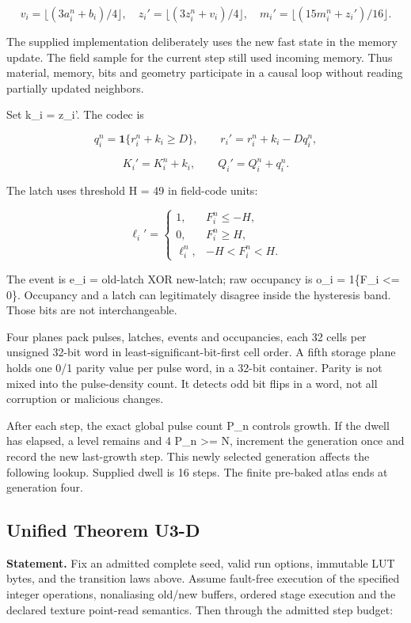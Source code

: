 \documentclass[11pt,a4paper]{article}
\begin{document}
\[v_i=\lfloor(3a_i^n+b_i)/4\rfloor,\quad
z_i'=\lfloor(3z_i^n+v_i)/4\rfloor,\quad
m_i'=\lfloor(15m_i^n+z_i')/16\rfloor.\]

The supplied implementation deliberately uses the new fast state in the memory update. The field sample for the current step still used incoming memory. Thus material, memory, bits and geometry participate in a causal loop without reading partially updated neighbors.

Set k\_i = z\_i'. The codec is

\[q_i^n=\mathbf1\{r_i^n+k_i\ge D\},\qquad
r_i'=r_i^n+k_i-Dq_i^n,\]

\[K_i'=K_i^n+k_i,\qquad Q_i'=Q_i^n+q_i^n.\]

The latch uses threshold H = 49 in field-code units:

\[\ell_i'=\begin{cases}1,&F_i^n\le-H,\\0,&F_i^n\ge H,\\\ell_i^n,&-H<F_i^n<H.\end{cases}\]

The event is e\_i = old-latch XOR new-latch; raw occupancy is o\_i = 1\{F\_i \textless= 0\}. Occupancy and a latch can legitimately disagree inside the hysteresis band. Those bits are not interchangeable.

Four planes pack pulses, latches, events and occupancies, each 32 cells per unsigned 32-bit word in least-significant-bit-first cell order. A fifth storage plane holds one 0/1 parity value per pulse word, in a 32-bit container. Parity is not mixed into the pulse-density count. It detects odd bit flips in a word, not all corruption or malicious changes.

After each step, the exact global pulse count P\_n controls growth. If the dwell has elapsed, a level remains and 4 P\_n \textgreater= N, increment the generation once and record the new last-growth step. This newly selected generation affects the following lookup. Supplied dwell is 16 steps. The finite pre-baked atlas ends at generation four.

\subsection{Unified Theorem U3-D}\label{unified-theorem-u3-d}

\textbf{Statement.} Fix an admitted complete seed, valid run options, immutable LUT bytes, and the transition laws above. Assume fault-free execution of the specified integer operations, nonaliasing old/new buffers, ordered stage execution and the declared texture point-read semantics. Then through the admitted step budget:
\end{document}

